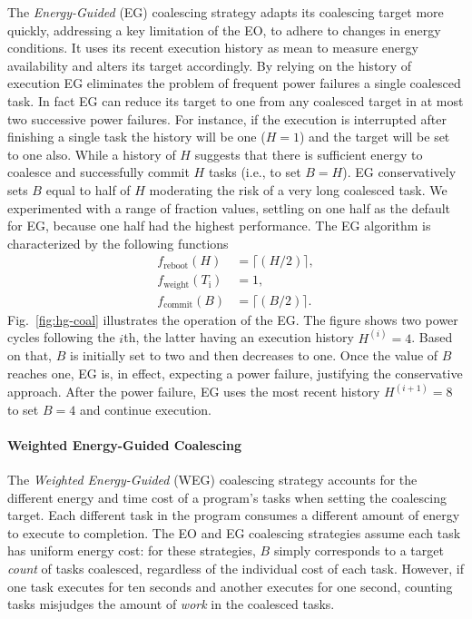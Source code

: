 The \emph{Energy-Guided} (EG) coalescing strategy adapts its coalescing target more quickly, addressing a key limitation of the EO, to adhere to changes in energy conditions. It uses its recent execution history as  mean to measure energy availability and alters its target accordingly. By relying on the history of execution EG eliminates the problem of frequent power failures a single coalesced task. In fact EG can reduce its target to one from any coalesced target in at most two successive power failures. For instance, if the execution is interrupted after finishing a single task the history will be one ($H = 1$) and the target will be set to one also. While a history of $H$ suggests that there is sufficient energy to coalesce and successfully commit $H$ tasks (i.e., to set $B = H$). EG conservatively sets $B$ equal to half of $H$ moderating the risk of a very long coalesced task. We experimented with a range of fraction values, settling on one half as the default for EG, because one half had the highest performance. The EG algorithm is characterized by the following functions
%
\begin{equation}
	\begin{split}
		 f_\text{reboot}(H) & = \lceil(H / 2)\rceil,\\
		 f_\text{weight}(T_\text{i}) & = 1, \\
		 f_\text{commit}(B) & = \lceil(B / 2)\rceil.
	\end{split}
	\label{eq:eg}
\end{equation}
%
Fig.~\ref{fig:hg-coal} illustrates the operation of the EG. The figure shows two power cycles following the $i$th, the latter having an
execution history $H^{(i)} = 4$. Based on that, $B$ is initially set to two and then decreases to one. Once the value of $B$ reaches one, EG is, in effect, expecting a power failure, justifying the conservative approach. After the power failure, EG uses the most recent history $H^{(i+1)} = 8$ to set $B = 4$ and continue execution.

\paragraph{Weighted Energy-Guided Coalescing}
\label{subsec:energyTaskAware}

The \emph{Weighted Energy-Guided} (WEG) coalescing strategy accounts for the different energy and time cost of a program's tasks when setting the coalescing target. Each different task in the program consumes a different amount of energy to execute to completion. The EO and EG coalescing strategies assume each task has uniform energy cost: for these strategies, $B$ simply corresponds to a target {\em count} of tasks coalesced, regardless of the individual cost of each task. However, if one task executes for ten seconds and another executes for one second, counting tasks misjudges the amount of {\em work} in the coalesced tasks.

